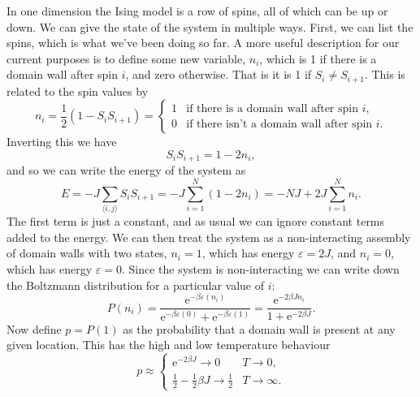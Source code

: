 \documentclass[fleqn]{NotesClass}
\newcommand*{\e}{\mathrm{e}}
\begin{document}
    In one dimension the Ising model is a row of spins, all of which can be up or down.
    We can give the state of the system in multiple ways.
    First, we can list the spins, which is what we've been doing so far.
    A more useful description for our current purposes is to define some new variable, \(n_i\), which is 1 if there is a domain wall after spin \(i\), and zero otherwise.
    That is it is 1 if \(S_i \ne S_{i + 1}\).
    This is related to the spin values by
    \begin{equation}
        n_i = \frac{1}{2}(1 - S_i S_{i + 1}) = 
        \begin{cases}
            1 & \text{if there is a domain wall after spin }i,\\
            0 & \text{if there isn't a domain wall after spin }i.
        \end{cases}
    \end{equation}
    Inverting this we have
    \begin{equation}
        S_i S_{i + 1} = 1 - 2n_i,
    \end{equation}
    and so we can write the energy of the system as
    \begin{equation}
        E = -J\sum_{\langle i, j \rangle}S_{i}S_{i + 1} = -J\sum_{i = 1}^{N}(1 - 2n_i) = -NJ + 2J\sum_{i = 1}^{N}n_i.
    \end{equation}
    The first term is just a constant, and as usual we can ignore constant terms added to the energy.
    We can then treat the system as a non-interacting assembly of domain walls with two states, \(n_i = 1\), which has energy \(\varepsilon = 2J\), and \(n_i = 0\), which has energy \(\varepsilon = 0\).
    Since the system is non-interacting we can write down the Boltzmann distribution for a particular value of \(i\):
    \begin{equation}
        P(n_i) = \frac{\e^{-\beta \varepsilon(n_i)}}{\e^{-\beta \varepsilon(0)} + \e^{-\beta \varepsilon(1)}} = \frac{\e^{-2\beta Jn_i}}{1 + \e^{-2\beta J}}.
    \end{equation}
    Now define \(p = P(1)\) as the probability that a domain wall is present at any given location.
    This has the high and low temperature behaviour
    \begin{equation}
        p \approx
        \begin{cases}
            \e^{-2\beta J} \to 0 & T \to 0,\\
            \displaystyle\frac{1}{2} - \frac{1}{2}\beta J \to \frac{1}{2} & T \to \infty.
        \end{cases}
    \end{equation}
    
\end{document}
